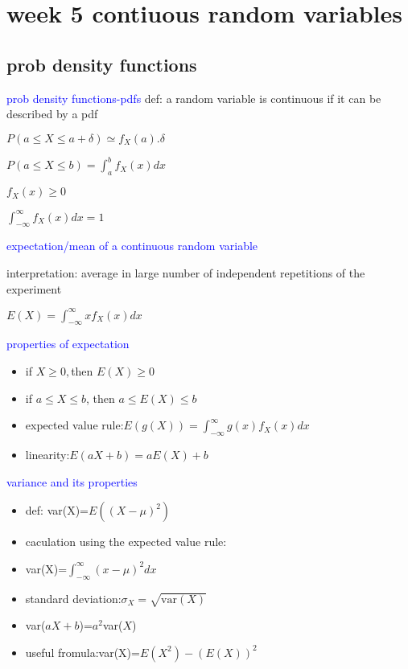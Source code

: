 \section*{week 5 contiuous random variables}

\subsection*{prob density functions}

\textcolor{blue}{prob density functions-pdfs}
def: a random variable is continuous if it can be described by a pdf

$P(a\leq X \leq a+\delta)\simeq f_X(a).\delta$

$P(a\leq X \leq b)=\int_a^b f_X(x)dx$

$f_X(x)\geq 0$

$\int_{-\infty}^\infty f_X(x)dx=1$


\textcolor{blue}{expectation/mean of a continuous random variable}

interpretation: average in large number of independent repetitions of the experiment

$E(X)=\int_{-\infty}^\infty xf_X(x)dx$

\textcolor{blue}{properties of expectation}
\begin{itemize}
    \item if $X \geq 0,$then $E(X)\geq 0$
    \item if $a\leq X \leq b$, then $a\leq E(X)\leq b$
    \item expected value rule:$E(g(X))=\int_{-\infty}^\infty g(x)f_X(x)dx$
    \item linearity:$E(a X+b)=a E(X)+b$ 
\end{itemize}



\textcolor{blue}{variance and its properties}

\begin{itemize}
    \item def: var(X)=$E((X-\mu)^2)$
    \item caculation using the expected value rule:
    \item var(X)=$\int_{-\infty}^{\infty}(x-\mu)^2dx$
    \item standard deviation:$\sigma_X=\sqrt{\text{var}(X)}$
    \item var($a X+b$)=$a^2$var($X$)
    \item useful fromula:var(X)=$E(X^2)-(E(X))^2$
\end{itemize}

